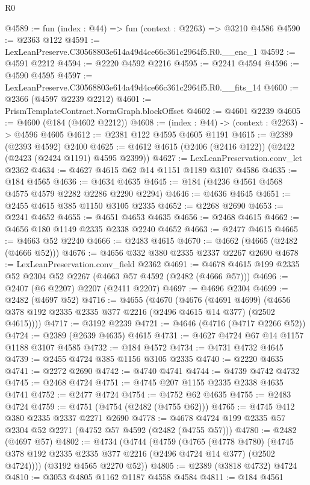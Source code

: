 \begin{lexlean}{R0}
\begin{coremodule}
@4589 := fun (index : @44) => fun (context : @2263) => @3210 @4586
@4590 := @2363 @122
@4591 := LexLeanPreserve.C30568803e614a49d4ce66c361c2964f5.R0.__enc_1
@4592 := @4591 @2212
@4594 := @2220 @4592 @2216
@4595 := @2241 @4594
@4596 := @4590 @4595
@4597 := LexLeanPreserve.C30568803e614a49d4ce66c361c2964f5.R0.__fits_14
@4600 := @2366 (@4597 @2239 @2212)
@4601 := PrismTemplateContract.NormGraph.blockOffset
@4602 := @4601 @2239
@4605 := @4600 (@184 (@4602 @2212))
@4608 := (index : @44) -> (context : @2263) -> @4596 @4605
@4612 := @2381 @122 @4595 @4605 @1191
@4615 := @2389 (@2393 @4592) @2400
@4625 := @4612 @4615 (@2406 (@2416 @122)) (@2422 (@2423 (@2424 @1191) @4595 @2399))
@4627 := LexLeanPreservation.conv_let @2362
@4634 := @4627 @4615 @62 @14 @1151 @1189 @3107 @4586
@4635 := @184 @4565
@4636 := @4634 @4635
@4645 := @184 (@4236 @4561 @4568 @4575 @4579 @2282 @2286 @2290 @2294)
@4646 := @4636 @4645
@4651 := @2455 @4615 @385 @1150 @3105 @2335
@4652 := @2268 @2690
@4653 := @2241 @4652
@4655 := @4651 @4653 @4635
@4656 := @2468 @4615
@4662 := @4656 @180 @1149 @2335 @2338 @2240 @4652
@4663 := @2477 @4615
@4665 := @4663 @52 @2240
@4666 := @2483 @4615
@4670 := @4662 (@4665 (@2482 (@4666 @52)))
@4676 := @4656 @332 @380 @2335 @2337 @2267 @2690
@4678 := LexLeanPreservation.conv_field @2362
@4691 := @4678 @4615 @199 @2335 @52 @2304 @52 @2267 (@4663 @57 @4592 (@2482 (@4666 @57)))
@4696 := @2407 (@6 @2207) @2207 (@2411 @2207)
@4697 := @4696 @2304
@4699 := @2482 (@4697 @52)
@4716 := @4655
    (@4670
      (@4676
        (@4691 @4699)
        (@4656 @378 @192 @2335 @2335 @377 @2216 (@2496 @4615 @14 @377) (@2502 @4615))))
@4717 := @3192 @2239
@4721 := @4646 (@4716 (@4717 @2266 @52))
@4724 := @2389 (@2639 @4635) @4615
@4731 := @4627 @4724 @67 @14 @1157 @1188 @3107 @4585
@4732 := @184 @4572
@4734 := @4731 @4732 @4645
@4739 := @2455 @4724 @385 @1156 @3105 @2335
@4740 := @2220 @4635
@4741 := @2272 @2690
@4742 := @4740 @4741
@4744 := @4739 @4742 @4732
@4745 := @2468 @4724
@4751 := @4745 @207 @1155 @2335 @2338 @4635 @4741
@4752 := @2477 @4724
@4754 := @4752 @62 @4635
@4755 := @2483 @4724
@4759 := @4751 (@4754 (@2482 (@4755 @62)))
@4765 := @4745 @412 @380 @2335 @2337 @2271 @2690
@4778 := @4678 @4724 @199 @2335 @57 @2304 @52 @2271 (@4752 @57 @4592 (@2482 (@4755 @57)))
@4780 := @2482 (@4697 @57)
@4802 := @4734
    (@4744
      (@4759
        (@4765
          (@4778 @4780)
          (@4745 @378 @192 @2335 @2335 @377 @2216 (@2496 @4724 @14 @377) (@2502 @4724))))
      (@3192 @4565 @2270 @52))
@4805 := @2389 (@3818 @4732) @4724
@4810 := @3053 @4805 @1162 @1187 @4558 @4584
@4811 := @184 @4561

\end{coremodule}
\end{lexlean}
